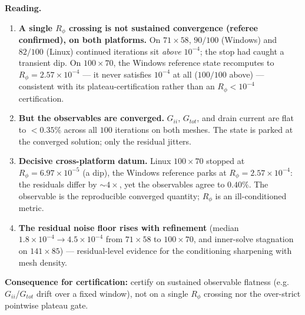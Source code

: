 \documentclass[11pt]{article}
\newcommand{\ten}[1]{\times 10^{#1}}
\begin{document}
\textbf{Reading.}
\begin{enumerate}[nosep]
\item \textbf{A single $R_\phi$ crossing is not sustained convergence (referee confirmed), on both platforms.} On $71\times58$, $90/100$ (Windows) and $82/100$ (Linux) continued iterations sit \emph{above} $10^{-4}$; the stop had caught a transient dip. On $100\times70$, the Windows reference state recomputes to $R_\phi=2.57\ten{-4}$ --- it never satisfies $10^{-4}$ at all ($100/100$ above) --- consistent with its plateau-certification rather than an $R_\phi<10^{-4}$ certification.
\item \textbf{But the observables are converged.} $G_{ii}$, $G_{tot}$, and drain current are flat to $<\!0.35\%$ across all $100$ iterations on both meshes. The state is parked at the converged solution; only the residual jitters.
\item \textbf{Decisive cross-platform datum.} Linux $100\times70$ stopped at $R_\phi=6.97\ten{-5}$ (a dip), the Windows reference parks at $R_\phi=2.57\ten{-4}$: the residuals differ by $\sim\!4\times$, yet the observables agree to $0.40\%$. The observable is the reproducible converged quantity; $R_\phi$ is an ill-conditioned metric.
\item \textbf{The residual noise floor rises with refinement} (median $1.8\ten{-4}\to4.5\ten{-4}$ from $71\times58$ to $100\times70$, and inner-solve stagnation on $141\times85$) --- residual-level evidence for the conditioning sharpening with mesh density.
\end{enumerate}
\textbf{Consequence for certification:} certify on sustained observable flatness (e.g.\ $G_{ii}$/$G_{tot}$ drift over a fixed window), not on a single $R_\phi$ crossing nor the over-strict pointwise plateau gate.
\end{document}
